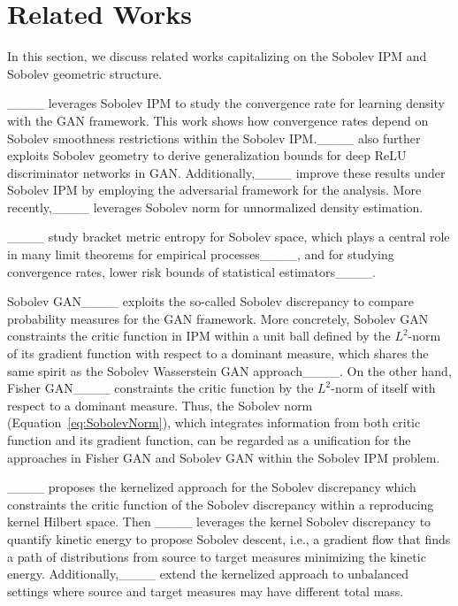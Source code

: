 \section{Related Works}
\label{sec:related_works}

In this section, we discuss related works capitalizing  on the Sobolev IPM and Sobolev geometric structure.

____ leverages Sobolev IPM to study the convergence rate for learning density with the GAN framework. This work shows how convergence rates depend on Sobolev smoothness restrictions within the Sobolev IPM.____ also further exploits Sobolev geometry to derive generalization bounds for deep ReLU discriminator networks in GAN. Additionally,____ improve these results under Sobolev IPM by employing the adversarial framework for the analysis. More recently,____ leverages Sobolev norm for unnormalized density estimation.



____ study bracket metric entropy for Sobolev space, which plays a central role in many limit theorems for empirical processes____, and for studying convergence rates, lower risk bounds of statistical estimators____.

Sobolev GAN____ exploits the so-called Sobolev discrepancy to compare probability measures for the GAN framework. More concretely, Sobolev GAN constraints the critic function in IPM within a unit ball defined by the $L^2$-norm of its gradient function with respect to a dominant measure, which shares the same spirit as the Sobolev Wasserstein GAN approach____. On the other hand, Fisher GAN____ constraints the critic function by the $L^2$-norm of itself with respect to a dominant measure. Thus, the Sobolev norm (Equation~\eqref{eq:SobolevNorm}), which integrates information from both critic function and its gradient function, can be regarded as a unification for the approaches in Fisher GAN and Sobolev GAN within the Sobolev IPM problem.

____ proposes the kernelized approach for the Sobolev discrepancy which constraints the critic function of the Sobolev discrepancy within a reproducing kernel Hilbert space. Then ____ leverages the kernel Sobolev discrepancy to quantify kinetic energy to propose Sobolev descent, i.e., a gradient flow that finds a path of distributions from source to target measures minimizing the kinetic energy. Additionally,____ extend the kernelized approach to unbalanced settings where source and target measures may have different total mass.

